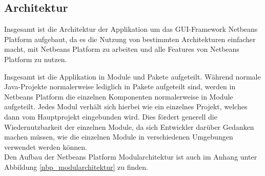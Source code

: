 \subsection{Architektur}
Insgesamt ist die Architektur der Applikation um das GUI-Framework Netbeans Platform aufgebaut, da es die Nutzung von bestimmten Architekturen einfacher macht, mit Netbeans Platform zu arbeiten und alle Features von Netbeans Platform zu nutzen.

Insgesamt ist die Applikation in Module und Pakete aufgeteilt. Während normale Java-Projekte normalerweise lediglich in Pakete aufgeteilt sind, werden in Netbeans Platform die einzelnen Komponenten normalerweise in Module aufgeteilt. Jedes Modul verhält sich hierbei wie ein einzelnes Projekt, welches dann vom Hauptprojekt eingebunden wird. Dies fördert generell die Wiedernutzbarkeit der einzelnen Module, da sich Entwickler darüber Gedanken machen müssen, wie die einzelnen Module in verschiedenen Umgebungen verwendet werden können. \\
Den Aufbau der Netbeans Platform Modularchitektur ist auch im Anhang unter Abbildung \ref{nbp_modularchitektur} zu finden.

